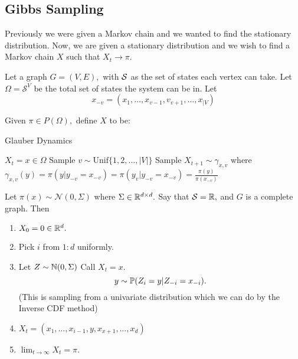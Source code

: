 \documentclass{chaistyle}
\begin{document}
\subsection*{Gibbs Sampling}
Previously we were given a Markov chain and we wanted to find the stationary distribution. Now, we are given a stationary distribution and we wish to find a Markov chain \(X\) such that \(X_t\to\pi.\)

Let a graph \(G=(V,E),\) with \(\cal S\) as the set of states each vertex can take. Let \(\Omega=\mathcal{S}^V\) be the total set of states the system can be in. Let \[x_{-v}=(x_1,\dots,x_{v-1},v_{v+1},\dots,x_{|V})\]
\begin{definition*}
    Given \(\pi\in P(\Omega),\) define \(X\) to be:
    \begin{algorithm}
    \caption{Glauber Dynamics}
    \begin{algorithmic}
        \STATE \(X_t=x\in\Omega\)
        \STATE Sample \(v\sim\text{Unif}\{1,2,\dots,|V|\}\)
        \STATE Sample \(X_{t+1}\sim\gamma_{x,v}\) where \(\gamma_{x,v}(y)=\pi(y|y_{-v}=x_{-v})=\pi(y_v|y_{-v}=x_{-v})=\frac{\pi(y)}{\pi(x_{-v})}\)
    \end{algorithmic}
    \end{algorithm}
    \newpage
\end{definition*}
\begin{example*}
    Let \(\pi(x)\sim\mathcal{N}(0,\Sigma)\) where \(\Sigma\in\R^{d\times d}.\) Say that \(\mathcal{S}=\R,\) and \(G\) is a complete graph. Then \begin{enumerate}
        \item \(X_0=0\in\R^d.\)
        \item Pick \(i\) from \(1:d\) uniformly.
        \item Let \(Z\sim\N(0,\Sigma)\) Call \(X_t=x.\) \[y\sim\P(Z_i=y|Z_{-i}=x_{-i}).\] (This is sampling from a univariate distribution which we can do by the Inverse CDF method)
        \item \(X_t=(x_1,\dots,x_{i-1},y,x_{x+1},\dots,x_d)\)
        \item \(\lim_{t \to \infty} X_t=\pi.\)
    \end{enumerate}
\end{example*}
\end{document}

